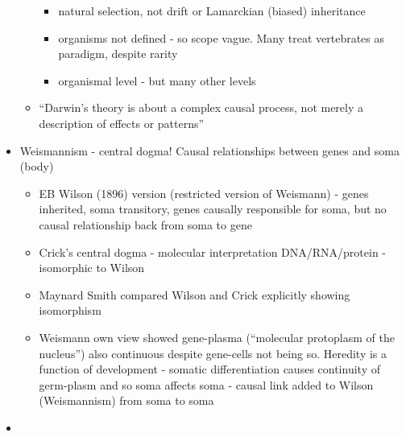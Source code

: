 \begin{itemize}
\begin{itemize}
		
		\begin{itemize}
			\item
			
			natural selection, not drift or Lamarckian (biased) inheritance
			
			\item
			
			organisms not defined - so scope vague. Many treat vertebrates as
			paradigm, despite rarity
			
			\item
			
			organismal level - but many other levels
			
		\end{itemize}
		\item
		
		``Darwin's theory is about a complex causal process, not merely a
		description of effects or patterns''
		
	\end{itemize}
	\item
	
	Weismannism - central dogma! Causal relationships between genes and
	soma (body)
	
	
	\begin{itemize}
		\item
		
		EB Wilson (1896) version (restricted version of Weismann) - genes
		inherited, soma transitory, genes causally responsible for soma, but
		no causal relationship back from soma to gene
		
		\item
		
		Crick's central dogma - molecular interpretation DNA/RNA/protein -
		isomorphic to Wilson
		
		\item
		
		Maynard Smith compared Wilson and Crick explicitly showing
		isomorphism
		
		\item
		
		Weismann own view showed gene-plasma (``molecular protoplasm of the
		nucleus'') also continuous despite gene-cells not being so. Heredity
		is a function of development - somatic differentiation causes
		continuity of germ-plasm and so soma affects soma - causal link
		added to Wilson (Weismannism) from soma to soma
		
	\end{itemize}
	\item
	

\end{itemize}

